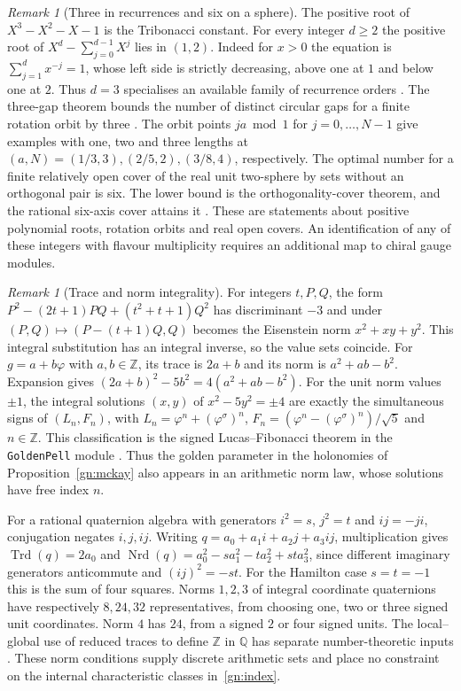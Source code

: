 \documentclass[aps,pra,onecolumn,superscriptaddress,nofootinbib,10pt]{revtex4-2}
\theoremstyle{definition}
\theoremstyle{remark}
\newtheorem{remark}[theorem]{Remark}
\begin{document}
\begin{remark}[Three in recurrences and six on a sphere]\label{gn:leandiscrete}
The positive root of $X^3-X^2-X-1$ is the Tribonacci constant.
For every integer $d\ge2$ the positive root of
$X^d-\sum_{j=0}^{d-1}X^j$ lies in $(1,2)$.
Indeed for $x>0$ the equation is $\sum_{j=1}^d x^{-j}=1$,
whose left side is strictly decreasing, above one at $1$ and
below one at $2$. Thus $d=3$ specialises an available family
of recurrence orders \cite[DBonacci/PerronRoot]{ub:lean}.
The three-gap theorem bounds the
number of distinct circular gaps for a finite rotation orbit
by three \cite{gn:sos,ub:lean}. The orbit points $j a\bmod1$ for
$j=0,\ldots,N-1$ give examples with one, two and three lengths
at $(a,N)=(1/3,3),(2/5,2),(3/8,4)$, respectively.
The optimal number for a finite relatively open cover of the
real unit two-sphere by sets without an orthogonal pair is six.
The lower bound is the orthogonality-cover theorem, and the
rational six-axis cover attains it \cite{ub:lean}.
These are statements about positive polynomial roots, rotation
orbits and real open covers. An identification of any of these
integers with flavour multiplicity requires an additional map
to chiral gauge modules.
\end{remark}

\begin{remark}[Trace and norm integrality]\label{gn:leanarith}
For integers $t,P,Q$, the form
$P^2-(2t+1)PQ+(t^2+t+1)Q^2$ has discriminant $-3$ and
under $(P,Q)\mapsto(P-(t+1)Q,Q)$ becomes the Eisenstein norm
$x^2+xy+y^2$. This integral substitution has an integral
inverse, so the value sets coincide. For $g=a+b\varphi$ with
$a,b\in\mathbb Z$, its trace is $2a+b$ and its norm is
$a^2+ab-b^2$. Expansion gives
$(2a+b)^2-5b^2=4(a^2+ab-b^2)$. For the unit norm values $\pm1$,
the integral solutions $(x,y)$ of $x^2-5y^2=\pm4$ are exactly
the simultaneous signs of $(L_n,F_n)$, with
$L_n=\varphi^n+(\varphi^\sigma)^n$,
$F_n=(\varphi^n-(\varphi^\sigma)^n)/\sqrt5$ and $n\in\mathbb Z$.
This classification is the signed Lucas--Fibonacci theorem in
the \texttt{GoldenPell} module \cite{ub:lean}.
Thus the golden parameter in the holonomies of
Proposition~\ref{gn:mckay} also appears in an arithmetic norm
law, whose solutions have free index $n$.

For a rational quaternion algebra with generators $i^2=s$,
$j^2=t$ and $ij=-ji$, conjugation negates $i,j,ij$.
Writing $q=a_0+a_1i+a_2j+a_3ij$, multiplication gives
$\operatorname{Trd}(q)=2a_0$ and
$\operatorname{Nrd}(q)=a_0^2-sa_1^2-ta_2^2+st a_3^2$,
since different imaginary generators anticommute and
$(ij)^2=-st$. For the Hamilton case $s=t=-1$ this is the
sum of four squares. Norms $1,2,3$ of integral coordinate
quaternions have respectively $8,24,32$ representatives,
from choosing one, two or three signed unit coordinates.
Norm $4$ has $24$, from a signed $2$ or four signed units.
The local--global use of reduced traces to define
$\mathbb Z$ in $\mathbb Q$ has separate number-theoretic
inputs \cite[Theorem~1]{gn:koenigsmann}. These norm conditions
supply discrete arithmetic sets and place no constraint on the
internal characteristic classes in~\eqref{gn:index}.
\end{remark}
\end{document}
